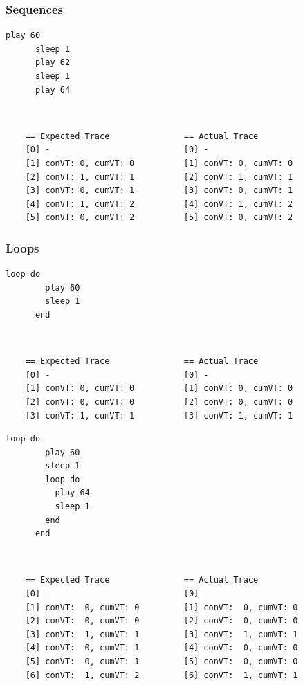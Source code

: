 \documentclass[11pt, abstracton, twoside, titlepage=true]{scrartcl}
\begin{document}
\subsubsection{Sequences}
\begin{minipage}{\textwidth}
	\begin{lstlisting}[style = sonicpi]
      play 60
      sleep 1
      play 62
      sleep 1
      play 64
	\end{lstlisting}
\end{minipage}
\\
\begin{lstlisting}
    == Expected Trace               == Actual Trace
    [0] -                           [0] -
    [1] conVT: 0, cumVT: 0          [1] conVT: 0, cumVT: 0
    [2] conVT: 1, cumVT: 1          [2] conVT: 1, cumVT: 1
    [3] conVT: 0, cumVT: 1          [3] conVT: 0, cumVT: 1
    [4] conVT: 1, cumVT: 2          [4] conVT: 1, cumVT: 2
    [5] conVT: 0, cumVT: 2          [5] conVT: 0, cumVT: 2
\end{lstlisting}

\subsubsection{Loops}
\begin{minipage}{\textwidth}
	\begin{lstlisting}[style = sonicpi]
      loop do
        play 60
        sleep 1
      end
	\end{lstlisting}
\end{minipage}
\\
\begin{lstlisting}
    == Expected Trace               == Actual Trace
    [0] -                           [0] -
    [1] conVT: 0, cumVT: 0          [1] conVT: 0, cumVT: 0
    [2] conVT: 0, cumVT: 0          [2] conVT: 0, cumVT: 0
    [3] conVT: 1, cumVT: 1          [3] conVT: 1, cumVT: 1
\end{lstlisting}

\begin{minipage}{\textwidth}
	\begin{lstlisting}[style = sonicpi]
      loop do
        play 60
        sleep 1
        loop do
          play 64
          sleep 1
        end
      end
	\end{lstlisting}
\end{minipage}
\\
\begin{lstlisting}
    == Expected Trace               == Actual Trace
    [0] -                           [0] -
    [1] conVT:  0, cumVT: 0         [1] conVT:  0, cumVT: 0
    [2] conVT:  0, cumVT: 0         [2] conVT:  0, cumVT: 0
    [3] conVT:  1, cumVT: 1         [3] conVT:  1, cumVT: 1
    [4] conVT:  0, cumVT: 1         [4] conVT:  0, cumVT: 0
    [5] conVT:  0, cumVT: 1         [5] conVT:  0, cumVT: 0
    [6] conVT:  1, cumVT: 2         [6] conVT:  1, cumVT: 1
\end{lstlisting}
\end{document}
